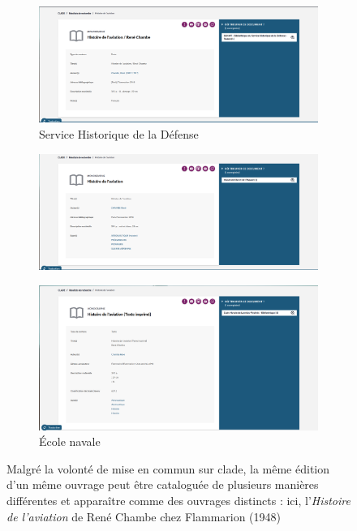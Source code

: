 \begin{figure}[htbp]
	\centering
	\begin{subfigure}{0.7\textwidth}
		\centering
		\includegraphics[width=\linewidth]{img/IMG_clade_histoireaviation_shdTL}
		\caption{Service Historique de la Défense}
		\label{img:cladehistoireaviationshdtl}
	\end{subfigure}
	\begin{subfigure}{0.7\textwidth}
		\centering
		\includegraphics[width=\linewidth]{img/IMG_clade_histoireaviation_mae}
		\caption{\mae}
		\label{img:cladehistoireaviationsmae}
	\end{subfigure}
	\hfill
	\begin{subfigure}{0.7\textwidth}
		\centering
		\includegraphics[width=\linewidth]{img/IMG_clade_histoireaviation_navale}
		\caption{École navale}
		\label{img:cladehistoireaviationnavale}
	\end{subfigure}
	\caption[Différences de catalogage entre les \bibmusee sur \ac{clade}]{Malgré la volonté de mise en commun sur \ac{clade}, la même édition d'un même ouvrage peut être cataloguée de plusieurs manières différentes et apparaître comme des ouvrages distincts : ici, l'\textit{Histoire de l'aviation} de René Chambe chez Flammarion (1948)}
	\label{fig:clade_histoaviation}
\end{figure}

